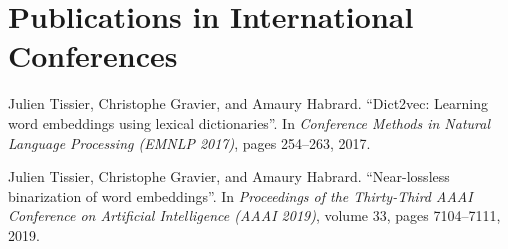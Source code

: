 
\section*{Publications in International Conferences}

\bigskip
Julien Tissier, Christophe Gravier, and Amaury Habrard. ``Dict2vec: Learning
word embeddings using lexical dictionaries''. In \textit{Conference
Methods in Natural Language Processing (EMNLP 2017)}, pages 254–263, 2017.

\bigskip
\bigskip
\noindent Julien Tissier, Christophe Gravier, and Amaury Habrard. ``Near-lossless
binarization of word embeddings''. In \textit{Proceedings of the Thirty-Third AAAI
Conference on Artificial Intelligence (AAAI 2019)}, volume 33, pages 7104–7111,
2019.
